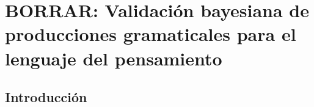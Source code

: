 

\chapter{BORRAR: Validación bayesiana de producciones gramaticales para el lenguaje del pensamiento}\label{chapter:PO}

\section{Introducción}


